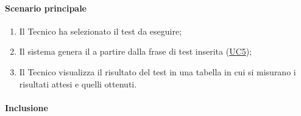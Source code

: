 \paragraph*{Scenario principale}
\begin{enumerate}
  \item Il Tecnico ha selezionato il test da eseguire;
  \item Il sistema genera il  a partire dalla frase di test inserita (\hyperref[UC5]{UC5});
  \item Il Tecnico visualizza il risultato del test in una tabella in cui si misurano i risultati attesi e quelli ottenuti. %
\end{enumerate}

\paragraph*{Inclusione}
\begin{itemize}
\end{itemize}
